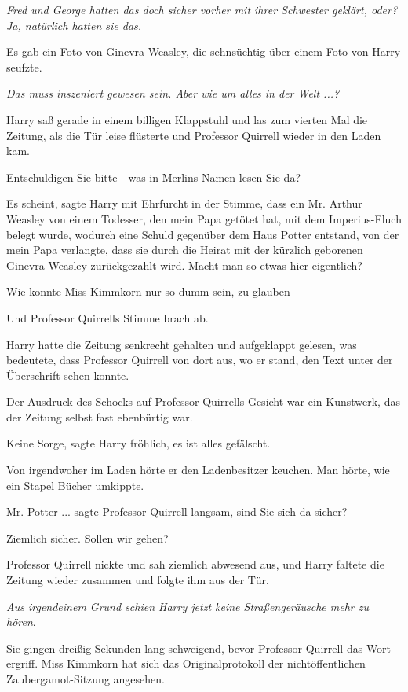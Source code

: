 \emph{Fred und George hatten das doch sicher vorher mit ihrer Schwester geklärt,
oder? Ja, natürlich hatten sie das.}

Es gab ein Foto von Ginevra Weasley, die sehnsüchtig über einem Foto von Harry
seufzte.

\emph{Das muss inszeniert gewesen sein. Aber wie um alles in der Welt ...?}

Harry saß gerade in einem billigen Klappstuhl und las zum vierten Mal die
Zeitung, als die Tür leise flüsterte und Professor Quirrell wieder in den Laden
kam.

\glqq{}Entschuldigen Sie bitte - was in Merlins Namen lesen Sie da?\grqq{}

\glqq{}Es scheint\grqq{}, sagte Harry mit Ehrfurcht in der Stimme, \glqq{}dass
ein Mr. Arthur Weasley von einem Todesser, den mein Papa getötet hat, mit dem
Imperius-Fluch belegt wurde, wodurch eine Schuld gegenüber dem Haus Potter
entstand, von der mein Papa verlangte, dass sie durch die Heirat mit der
kürzlich geborenen Ginevra Weasley zurückgezahlt wird. Macht man so etwas hier
eigentlich?\grqq{}

\glqq{}Wie konnte Miss Kimmkorn nur so dumm sein, zu glauben -\grqq{}

Und Professor Quirrells Stimme brach ab.

Harry hatte die Zeitung senkrecht gehalten und aufgeklappt gelesen, was
bedeutete, dass Professor Quirrell von dort aus, wo er stand, den Text unter der
Überschrift sehen konnte.

Der Ausdruck des Schocks auf Professor Quirrells Gesicht war ein Kunstwerk, das
der Zeitung selbst fast ebenbürtig war.

\glqq{}Keine Sorge\grqq{}, sagte Harry fröhlich, \glqq{}es ist alles
gefälscht.\grqq{}

Von irgendwoher im Laden hörte er den Ladenbesitzer keuchen. Man hörte, wie ein
Stapel Bücher umkippte.

\glqq{}Mr. Potter ...\grqq{} sagte Professor Quirrell langsam, \glqq{}sind Sie
sich da sicher?\grqq{}

\glqq{}Ziemlich sicher. Sollen wir gehen?\grqq{}

Professor Quirrell nickte und sah ziemlich abwesend aus, und Harry faltete die
Zeitung wieder zusammen und folgte ihm aus der Tür.

\emph{Aus irgendeinem Grund schien Harry jetzt keine Straßengeräusche mehr zu
hören}.

Sie gingen dreißig Sekunden lang schweigend, bevor Professor Quirrell das Wort
ergriff. \glqq{}Miss Kimmkorn hat sich das Originalprotokoll der
nichtöffentlichen Zaubergamot-Sitzung angesehen.\grqq{}


